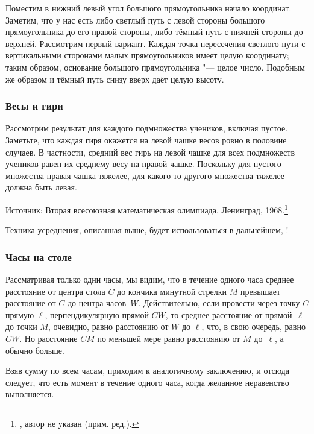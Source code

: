 \documentclass[twoside]{book}
\begin{document}
Поместим в нижний левый угол большого прямоугольника начало координат.
Заметим, что у нас есть либо светлый путь с левой стороны большого прямоугольника до его правой стороны, либо тёмный путь с нижней стороны до верхней.
Рассмотрим первый вариант.
Каждая точка пересечения светлого пути с вертикальными сторонами малых прямоугольников имеет целую координату; таким образом, основание большого прямоугольника "--- целое число.
Подобным же образом и тёмный путь снизу вверх даёт целую высоту.

\subsubsection*{Весы и гири} %

Рассмотрим результат для каждого подмножества учеников, включая пустое.
Заметьте, что каждая гиря окажется на левой чашке весов ровно в половине случаев.
В частности, средний вес гирь на левой чашке для всех подмножеств учеников равен их среднему весу на правой чашке.
Поскольку для пустого множества правая чашка тяжелее, 
для какого-то другого множества тяжелее должна быть левая.\heart

\medskip
{\small

Источник: Вторая всесоюзная математическая олимпиада, Ленинград, 1968.\footnote{\cite[№110]{ВсМО}, автор не указан (прим. ред.).}

}

  \medskip
Техника усреднения, описанная выше, будет использоваться в дальнейшем, !

\subsubsection*{Часы на столе} %

Рассматривая только одни часы, 
мы видим, что в течение одного часа среднее расстояние от центра стола $C$ до кончика минутной стрелки $M$ превышает расстояние от $C$ до центра часов~$W$.
Действительно, если провести через точку $C$ прямую $\ell$, перпендикулярную прямой $CW$, 
то среднее расстояние от прямой~$\ell$ до точки $M$, очевидно, равно расстоянию от $W$ до $\ell$,
что, в свою очередь, равно $CW$.
Но расстояние $CM$ по меньшей мере равно расстоянию от $M$ до~$\ell$, а обычно больше.

Взяв сумму по всем часам, приходим к аналогичному заключению, и отсюда следует, что есть момент в течение одного часа, когда желанное неравенство выполняется.\heart
\end{document}
